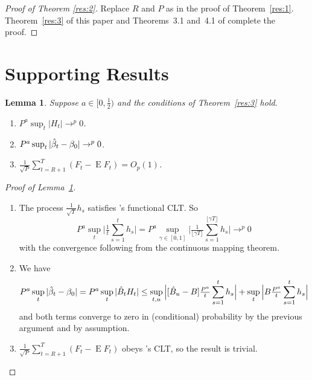\documentclass[12pt,fleqn]{article}
\newcommand\citepos[2][]{\citeauthor{#2}'s \citeyearpar[#1]{#2}}
\newtheorem{lema}{Lemma}[section]
\theoremstyle{definition}
\DeclareMathOperator{\E}{E}
\newcommand{\Bh}{\hat{B}}
\newcommand{\btrue}[1][]{\if#1*\hat\beta_{T+1}\else\beta_0\fi}
\newcommand{\bh}{\hat{\beta}}
\newcommand{\clt}{CLT}
\begin{document}
\begin{proof}[Proof of Theorem \ref{res:2}]
  Replace $R$ and $P$ as in the proof of Theorem~\ref{res:1}.
  Theorem~\ref{res:3} of this paper and Theorems~3.1 and~4.1 of
  \citet{RoW:05} complete the proof.
\end{proof}

\section{Supporting Results}

\begin{lema}\label{res:a2}
  Suppose $a \in [0,\frac12)$ and the conditions of Theorem~\ref{res:3}
  hold.
  \begin{enumerate}
  \item $P^a \sup_t | H_{t} | \to^p 0$.
  \item $P^a \sup_t | \bh_{t} - \btrue | \to^{p} 0$.
  \item $\tfrac{1}{\sqrt{P}} \sum_{t=R+1}^T (F_t - \E F_t) = O_{p}(1)$.
  \end{enumerate}
\end{lema}

\begin{proof}[Proof of Lemma~\ref{res:a2}]
  \begin{enumerate}
  \item The process $\tfrac{1}{\sqrt{T}} h_{s}$ satisfies
    \citepos[Theorem 3.1]{JoD:00b} functional \clt.  So
    \begin{equation}
      P^a \sup_t \Big| \tfrac1t \sum_{s=1}^t h_{s} \Big| =
      P^a \sup_{\gamma \in [0,1]} \Big| \tfrac{1}{\lfloor \gamma
        T\rfloor} \sum_{s=1}^{\lfloor \gamma T \rfloor} h_{s} \Big| \to^{p} 0
    \end{equation}
    with the convergence following from the continuous mapping
    theorem.
  \item We have
    \begin{equation}
      P^a \sup_t | \bh_t - \btrue | = P^a \sup_t |\Bh_{t}
      H_{t}| \leq \sup_{t,u} \Big| [ \Bh_u - B]
      \tfrac{P^a}{t} \sum_{s=1}^t h_{s} \Big| + \sup_{t} \Big|
      B \tfrac{P^a}{t} \sum_{s=1}^t h_{s} \Big|
    \end{equation}
    and both terms converge to zero in (conditional) probability by
    the previous argument and by assumption.
  \item $\tfrac{1}{\sqrt{P}} \sum_{t=R+1}^T (F_t - \E F_t)$ obeys
    \citepos{Jon:97} \clt, so the result is trivial.
  \end{enumerate}
\end{proof}
\end{document}
